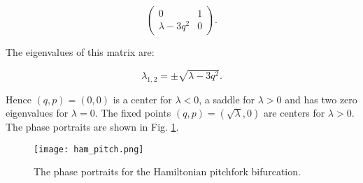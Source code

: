 \documentclass{article}
\begin{document}
\begin{equation}
\left(
\begin{array}{cc} 
0 & 1\\
\lambda-3q^2 & 0
\end{array}
\right).
\label{eq:hamApp18}
\end{equation}

\noindent
The eigenvalues of this matrix are:

\[
\lambda_{1, 2} = \pm \sqrt{\lambda-3q^2}.
\]

\noindent
Hence $(q, p) = (0, 0)$ is a center for $\lambda <0$, a saddle for $\lambda >0$ and  has two zero eigenvalues for $\lambda =0$. The fixed points $(q, p) = (\sqrt{\lambda}, 0)$ are centers for $\lambda >0$. The phase portraits are shown in Fig. \ref{fig:appC_fig4}.



 \begin{figure}[htb!]
\begin{center}
\texttt{[image: ham\_pitch.png]}
\end{center}
\caption{The phase portraits for the Hamiltonian pitchfork bifurcation.}
\label{fig:appC_fig4}
\end{figure}
\end{document}
